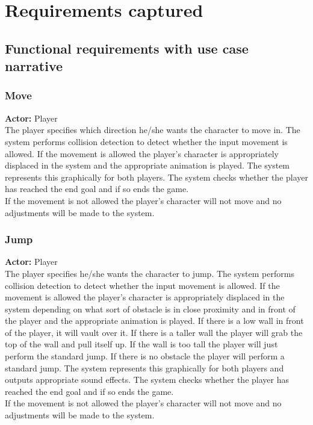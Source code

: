 \documentclass[11pt,a4paper]{article}
\begin{document}
\section{Requirements captured}
\subsection{Functional requirements with use case narrative}
\subsubsection{Move}
\textbf{Actor:} Player\smallskip\\
The player specifies which direction he/she wants the character to move in. The system performs collision detection to detect whether the input movement is allowed. If the movement is allowed the player's character is appropriately displaced in the system and the appropriate animation is played. The system represents this graphically for both players. The system checks whether the player has reached the end goal and if so ends the game.\smallskip\\
If the movement is not allowed the player's character will not move and no adjustments will be made to the system.

\subsubsection{Jump}
\textbf{Actor:} Player\smallskip\\
The player specifies he/she wants the character to jump. The system performs collision detection to detect whether the input movement is allowed. If the movement is allowed the player's character is appropriately displaced in the system depending on what sort of obstacle is in close proximity and in front of the player and the appropriate animation is played. If there is a low wall in front of the player, it will vault over it. If there is a taller wall the player will grab the top of the wall and pull itself up. If the wall is too tall the player will just perform the standard jump. If there is no obstacle the player will perform a standard jump. The system represents this graphically for both players and outputs appropriate sound effects. The system checks whether the player has reached the end goal and if so ends the game.\smallskip\\
If the movement is not allowed the player's character will not move and no adjustments will be made to the system.
\end{document}
